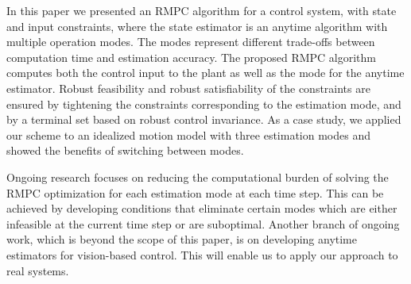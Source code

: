 In this paper we presented an RMPC algorithm for a control system, with state and input constraints, where the state estimator is an anytime algorithm with multiple operation modes.
The modes represent different trade-offs between computation time and estimation accuracy.
The proposed RMPC algorithm computes both the control input to the plant as well as the mode for the anytime estimator. %
Robust feasibility and robust satisfiability of the constraints are ensured by tightening the constraints %
corresponding to the estimation mode, and by a terminal set based on robust control invariance.
As a case study, we applied our scheme to an idealized motion model with three estimation modes and showed the benefits of switching between modes.

Ongoing research focuses on reducing the computational burden of solving the RMPC optimization for each estimation mode at each time step.
This can be achieved by developing conditions that eliminate certain modes which are either infeasible at the current time step or are suboptimal.
Another branch of ongoing work, which is beyond the scope of this paper, is on developing anytime estimators for vision-based control.
This will enable us to apply our approach to real systems.

